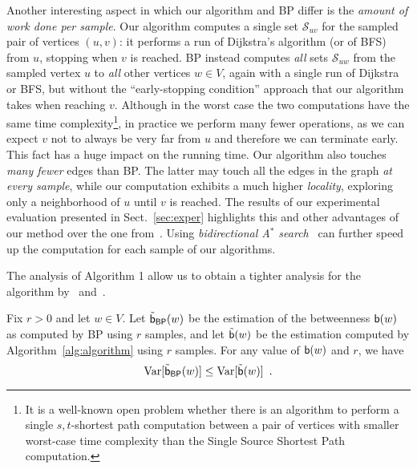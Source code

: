 Another interesting aspect in which our algorithm and \textsf{BP} differ is the
\emph{amount of work done per sample}. Our algorithm computes a single set
$\mathcal{S}_{uv}$ for the sampled pair of vertices $(u,v)$: it performs a run
of Dijkstra's algorithm (or of BFS) from $u$, stopping when $v$ is reached.
\textsf{BP} instead computes \emph{all} sets $\mathcal{S}_{uw}$ from the sampled
vertex $u$ to \emph{all} other vertices $w\in V$, again with a single run of Dijkstra or BFS,
but without the ``early-stopping condition'' approach that our algorithm takes
when reaching $v$. Although in the worst case the two computations have the same time
complexity\footnote{It is a well-known open problem whether there is an
algorithm to perform a single $s,t$-shortest path computation between a pair of
vertices with smaller worst-case time complexity than the Single Source Shortest
Path computation.}, in practice we perform many fewer operations, as we can
expect $v$ not to always be very far from $u$ and therefore we can terminate
early. This fact has a huge impact on the running time. Our algorithm also
touches \emph{many fewer} edges than \textsf{BP}. The latter may touch all the
edges in the graph \emph{at every sample}, while our computation exhibits a much
higher \emph{locality}, exploring only a neighborhood of $u$ until $v$ is
reached. The results of our experimental evaluation presented in
Sect.~\ref{sec:exper} highlights this and other advantages of our method over
the one from~\citep{JacobKLPT05,BrandesP07}. Using \emph{bidirectional A$^*$
search}~\citep{Pohl69,KaindlK97} can further speed up the computation for each
sample of our algorithms.

\ifproof
The analysis of Algorithm 1 allow us to obtain a tighter analysis for the
algorithm by~\citet{BrandesP07} and~\citet{JacobKLPT05}.

\begin{lemma}\label{lem:variance}
  Fix $r>0$ and let $w\in V$. Let $\tilde{\mathsf{b}}_\mathsf{BP}(w)$ be the estimation
  of the betweenness $\mathsf{b}(w)$ as computed by \textsf{BP} using $r$ samples, and
  let $\tilde{\mathsf{b}}(w)$ be the estimation computed by
  Algorithm~\ref{alg:algorithm} using $r$ samples. %
  For any value of $\mathsf{b}(w)$ and $r$, we have
  \[
  \mathrm{Var}[\tilde{\mathsf{b}}_\mathsf{BP}(w)]\le\mathrm{Var}[\tilde{\mathsf{b}}(w)]\enspace.
  \]
\end{lemma}

